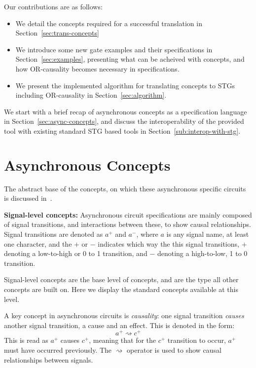 \documentclass[british,conference,compsoc]{IEEEtran}
\begin{document}
Our contributions are as follows:
\begin{itemize}
  \item We detail the concepts required for a successful  
  translation in Section~\ref{sec:trans-concepts}
  \item We introduce some new gate examples and their specifications in
  Section~\ref{sec:examples}, presenting what can be acheived with
  concepts, and how OR-causality becomes necessary in specifications.
  \item We present the implemented algorithm for translating concepts to STGs
  including OR-causality in Section~\ref{sec:algorithm}.
\end{itemize}

\noindent
We start with a brief recap of asynchronous concepts as a specification language in
Section~\ref{sec:async-concepts}, and discuss the interoperability of the provided tool 
with existing standard STG based tools in Section~\ref{sub:interop-with-stg}.


\section{Asynchronous Concepts\label{sec:async-concepts}}


The abstract base of the concepts, on which these asynchronous specific circuits
is discussed in~\cite{2015_Beaumont_MEMOCODE}.

\textbf{\label{signal-level}Signal-level concepts:} Asynchronous circuit specifications
are mainly composed of signal transitions, and interactions between these, to show
causal relationships. Signal transitions are denoted as $a^{+}$ and $a^{-}$, where $a$ is
any signal name, at least one character, and the $+$ or $-$ indicates which way the 
this signal transitions, $+$ denoting a low-to-high or 0 to 1 transition, and $-$ denoting
a high-to-low, 1 to 0 transition. 

Signal-level concepts are the base level of concepts, and are 
the type all other concepts are built on. Here we display the standard concepts
available at this level.

A key concept in asynchronous circuits is \emph{causality}:
one signal transition \emph{causes} another signal transition, a cause and an effect.
This is denoted in the form: 
\[
a^{+}\rightsquigarrow c^{+}
\]
This is read as $a^{+}$ causes $c^{+}$, meaning that for the $c^{+}$ transition to
occur, $a^{+}$ must have occurred previously. The $\rightsquigarrow$ operator is
used to show causal relationships between signals.
 
\end{document}
